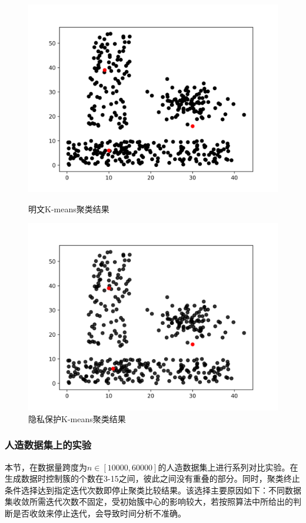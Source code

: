 \begin{figure}[htbp] %
	\begin{minipage}[t]{0.5\linewidth}
		\includegraphics[width=\linewidth]{img/lsun_ptxt.png}
		\caption{明文K-means聚类结果}
		\label{f4}
	\end{minipage}%
	\hfill%
	\begin{minipage}[t]{0.5\linewidth}
		\includegraphics[width=\linewidth]{img/lsun_ctxt.png}
		\caption{隐私保护K-means聚类结果}
		\label{f5}
	\end{minipage}
\end{figure}
\subsubsection{人造数据集上的实验}
本节，在数据量跨度为$ n\in[10000,60000] $的人造数据集上进行系列对比实验。在生成数据时控制簇的个数在3-15之间，彼此之间没有重叠的部分。同时，聚类终止条件选择达到指定迭代次数即停止聚类比较结果。该选择主要原因如下：不同数据集收敛所需迭代次数不固定，受初始簇中心的影响较大，若按照算法中所给出的判断是否收敛来停止迭代，会导致时间分析不准确。

